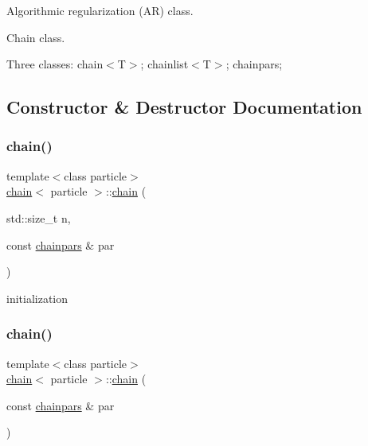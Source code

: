 Algorithmic regularization (AR) class. 

Chain class.

Three classes\+: chain$<$\+T$>$; chainlist$<$\+T$>$; chainpars; 

\subsection{Constructor \& Destructor Documentation}
\hypertarget{classchain_a64c82c65e14b76682bceb525bb1801f7}{}\label{classchain_a64c82c65e14b76682bceb525bb1801f7} 
\subsubsection{\texorpdfstring{chain()}{chain()}\hspace{0.1cm}{\footnotesize\ttfamily [1/2]}}
{\footnotesize\ttfamily template$<$class particle$>$ \\
\hyperlink{classchain}{chain}$<$ particle $>$\+::\hyperlink{classchain}{chain} (\begin{DoxyParamCaption}\item[{std\+::size\+\_\+t}]{n,  }\item[{const \hyperlink{classchainpars}{chainpars} \&}]{par }\end{DoxyParamCaption})\hspace{0.3cm}{\ttfamily [inline]}}



initialization 

\hypertarget{classchain_a6cca333a0d626f8ac763e1dc5d1d35ea}{}\label{classchain_a6cca333a0d626f8ac763e1dc5d1d35ea} 
\subsubsection{\texorpdfstring{chain()}{chain()}\hspace{0.1cm}{\footnotesize\ttfamily [2/2]}}
{\footnotesize\ttfamily template$<$class particle$>$ \\
\hyperlink{classchain}{chain}$<$ particle $>$\+::\hyperlink{classchain}{chain} (\begin{DoxyParamCaption}\item[{const \hyperlink{classchainpars}{chainpars} \&}]{par }\end{DoxyParamCaption})\hspace{0.3cm}{\ttfamily [inline]}}

